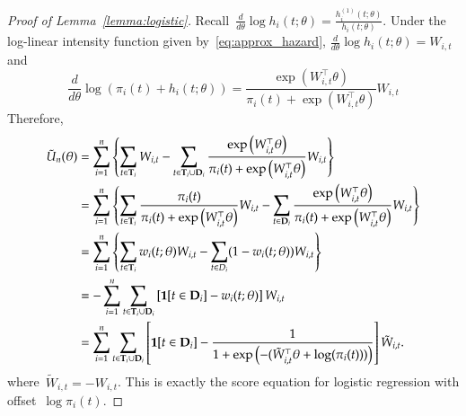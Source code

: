 \documentclass[12pt]{amsart}
\def\bfT{{\bf T}}
\def\bfD{{\bf D}}
\begin{document}
\begin{proof}[Proof of Lemma~\ref{lemma:logistic}]
Recall~$\frac{d}{d\theta} \log h_i (t; \theta) = \frac{h^{(1)}_i (t; \theta)}{h_i (t; \theta)}$. Under the log-linear intensity function given by~\eqref{eq:approx_hazard}, $\frac{d}{d\theta} \log h_i (t; \theta) = W_{i,t}$ and
\[
\frac{d}{d \theta} \log \left( \pi_i (t) + h_i (t;\theta) \right) =
\frac{\exp \left( W_{i,t}^\top \theta \right)}{\pi_i (t) + \exp
  \left( W_{i,t}^\top \theta \right)} W_{i,t}
\]
Therefore,
\begin{align*}
\tilde U_n (\theta)
  &= \sum_{i=1}^n \left \{ \sum_{t \in \bfT_i} W_{i,t} - \sum_{t \in \bfT_i \cup \bfD_i} \frac{\exp \left( W_{i,t}^\top \theta \right)}{\pi_i (t) + \exp \left( W_{i,t}^\top \theta \right)}  W_{i,t} \right \} \\
  &= \sum_{i=1}^n \left \{ \sum_{t \in \bfT_i} \frac{\pi_i (t)}{\pi_i (t) + \exp \left( W_{i,t}^\top \theta \right)} W_{i,t} - \sum_{t \in \bfD_i} \frac{\exp \left( W_{i,t}^\top \theta \right)}{\pi_i (t) + \exp \left( W_{i,t}^\top \theta \right)} W_{i,t} \right \} \\
  &= \sum_{i=1}^n \left \{ \sum_{t \in \bfT_i} w_{i} (t; \theta) W_{i,t} -
    \sum_{t \in D_i} (1 - w_i (t; \theta)) W_{i,t} \right \} \\
  &= - \sum_{i=1}^n \sum_{t \in \bfT_i \cup \bfD_i} \left[ {\bf 1} [t \in \bfD_i]  - w_{i} (t; \theta) \right] W_{i,t} \\
  &= \sum_{i=1}^n \sum_{t \in \bfT_i \cup \bfD_i}
    \left[ {\bf 1} [t \in \bfD_i]  - \frac{1}{1 + \exp\left( - (
          \tilde W_{i,t}^\top \theta + \log (\pi_i (t) ) ) \right)}
    \right] \tilde W_{i,t}.
\end{align*}
where~$\tilde W_{i,t} = - W_{i,t}$. This is exactly the score equation
for logistic regression with offset~$\log \pi_i (t)$.
\end{proof}
\end{document}
